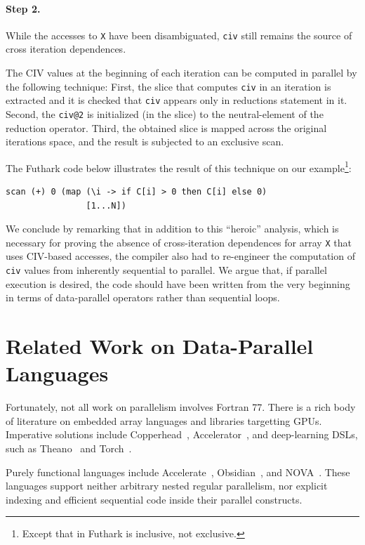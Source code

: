 \paragraph{Step 2.} While the accesses to \texttt{X} have been
disambiguated, \texttt{civ} still remains the source of cross
iteration dependences.

The CIV values at the beginning of each iteration can be computed in
parallel by the following technique:
%
First, the slice that computes \texttt{civ} in an iteration is
extracted and it is checked that \texttt{civ} appears only in
reductions statement in it. Second, the \texttt{civ@2} is initialized
(in the slice) to the neutral-element of the reduction
operator. Third, the obtained slice is mapped across the original
iterations space, and the result is subjected to an exclusive scan.

The Futhark code below illustrates the result of this technique on our
example\footnote{Except that  in Futhark is inclusive, not
  exclusive.}:

\begin{lstlisting}
scan (+) 0 (map (\i -> if C[i] > 0 then C[i] else 0)
                [1...N])
\end{lstlisting}

We conclude by remarking that in addition to this ``heroic'' analysis,
which is necessary for proving the absence of cross-iteration
dependences for array \texttt{X} that uses CIV-based accesses, the
compiler also had to re-engineer the computation of \texttt{civ}
values from inherently sequential to parallel.  We argue that, if
parallel execution is desired, the code should have been written from
the very beginning in terms of data-parallel operators rather than
sequential loops.

\section{Related Work on Data-Parallel Languages}
\label{sec:related-data-par}

Fortunately, not all work on parallelism involves Fortran 77.  There
is a rich body of literature on embedded array languages and libraries
targetting GPUs. Imperative solutions include
Copperhead~\cite{Copperhead}, Accelerator~\cite{MSaccelerator}, and
deep-learning DSLs, such as Theano~\cite{Theano} and
Torch~\cite{Torch7}.

Purely functional languages include
Accelerate~\cite{mcdonell2013optimising},
Obsidian~\cite{claessen2012expressive}, and
NOVA~\cite{collins2014nova}.  These languages support neither
arbitrary nested regular parallelism, nor explicit indexing and
efficient sequential code inside their parallel constructs.

